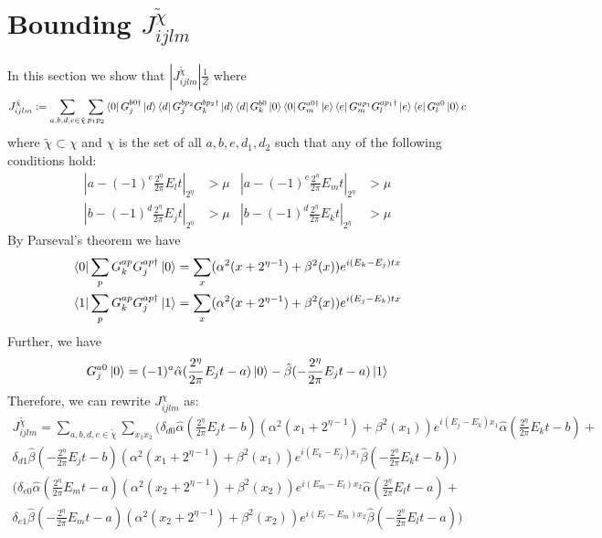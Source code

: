 \documentclass[aps,floatfix,10pt,amssymb,amsfont,amsmath,superscriptaddress,float,nofootinbib,longbibliography,nobalancelastpage,twocolumn]{revtex4-2}
\begin{document}
\section{Bounding $J^{\tilde\chi}_{ijlm}$}
\label{appendix:bound_J}
In this section we show that $|J_{ijlm}^{\tilde\chi}|\frac{1}{Z}$ where
\begin{equation}
    J_{ijlm}^{\tilde\chi}:= \sum_{a,b,d,e\in \tilde \chi} \sum_{p_1p_2} \bra{0} G^{b0\dagger}_j\ket{d}\bra{d}G^{bp_2}_jG^{bp_2\dagger}_k\ket{d}\bra{d}G^{b0}_k\ket{0}
    \bra{0}G_m^{a0\dagger}\ket{e}\bra{e}G_m^{ap_1}G_l^{ap_1\dagger}\ket{e}\bra{e}G_l^{a0}\ket{0} c
\end{equation}
where $\tilde \chi \subset \chi$ and $\chi$ is the set of all $a,b,e,d_1,d_2$ such that any of the following conditions hold:
\begin{equation}
\begin{aligned}
    |a-(-1)^e\frac{2^{\eta}}{2\pi}E_lt|_{2^{\eta}} &> \mu  &|a-(-1)^e\frac{2^{\eta}}{2\pi}E_mt|_{2^{\eta}} &> \mu\\
    |b-(-1)^{d}\frac{2^{\eta}}{2\pi}E_jt|_{2^{\eta}} &> \mu   &|b-(-1)^{d}\frac{2^{\eta}}{2\pi}E_kt|_{2^{\eta}}& > \mu
\end{aligned}
\end{equation}
By Parseval's theorem we have
\begin{align}
    \bra{0}\sum_p G_k^{ap}G_j^{ap\dagger}\ket{0} &= \sum_x 
        (\alpha^2(x + 2^{\eta-1}) + \beta^2(x))e^{i(E_k-E_j)tx}\\
         \bra{1}\sum_p G_k^{ap}G_j^{ap\dagger}\ket{1} &= 
        \sum_x(\alpha^2(x + 2^{\eta-1}) + \beta^2(x))e^{i(E_j-E_k)tx}
    \end{align}
Further, we have 
\begin{equation}
    G_j^{a0}\ket{0} = (-1)^a\hat \alpha(\frac{2^{\eta}}{2\pi}E_jt-a) \ket{0} -\hat\beta (-\frac{2^{\eta}}{2\pi}E_jt-a)\ket{1}
\end{equation}
Therefore, we can rewrite $J^{\chi}_{ijlm}$ as:
\begin{multline}
    J_{ijlm}^{\tilde\chi}= \sum_{a,b,d,e\in \tilde \chi} \sum_{x_1x_2} \bigg(\delta_{d0}\hat \alpha(\frac{2^{\eta}}{2\pi}E_jt-b)(\alpha^2(x_1 + 2^{\eta-1}) + \beta^2(x_1))e^{i(E_j-E_k)x_1}\hat \alpha(\frac{2^{\eta}}{2\pi}E_kt-b)
    +\\\delta_{d1}\hat \beta(-\frac{2^{\eta}}{2\pi}E_jt-b)(\alpha^2(x_1 + 2^{\eta-1}) + \beta^2(x_1))e^{i(E_k-E_j)x_1}\hat \beta(-\frac{2^{\eta}}{2\pi}E_kt-b)\bigg)
    \\
    \bigg(\delta_{e0}\hat \alpha(\frac{2^{\eta}}{2\pi}E_mt-a)(\alpha^2(x_2 + 2^{\eta-1}) + \beta^2(x_2))e^{i(E_m-E_l)x_2}\hat \alpha(\frac{2^{\eta}}{2\pi}E_lt-a)
    +\\\delta_{e1}\hat \beta(-\frac{2^{\eta}}{2\pi}E_mt-a)(\alpha^2(x_2 + 2^{\eta-1}) + \beta^2(x_2))e^{i(E_l-E_m)x_2}\hat \beta(-\frac{2^{\eta}}{2\pi}E_lt-a)\bigg)
\end{multline}
\end{document}

